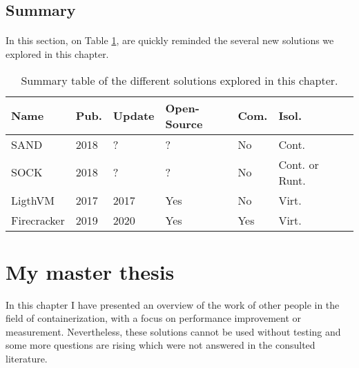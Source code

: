 \subsection{Summary}
\paragraph{}In this section, on Table \ref{tab:summary}, are quickly reminded the several new solutions we explored in this chapter.
\begin{table}[!h]

  \begin{center}
    \begin{tabular}{|p{}|p{}|p{}|p{}|p{}|p{}|p{}|}
       \hline
       \textbf{Name} & \textbf{Pub.}\footnotemark & \textbf{Update}\footnotemark & \textbf{Open-Source} & \textbf{Com.}\footnotemark & \textbf{Isol.}\footnotemark \\
       \hline
       SAND\cite{akkus2018sand} & 2018 & ? & ? & No & Cont. \\
       \hline
       SOCK\cite{oakes2018sock} & 2018 & ? & ? & No & Cont. or Runt. \\
       \hline
       LigthVM\cite{manco2017my} & 2017 & 2017 & Yes & No & Virt. \\
       \hline
       Firecracker\cite{agachefirecracker} & 2019 & 2020 & Yes & Yes & Virt.\\
       \hline
    \end{tabular}
  \end{center}
  \caption{Summary table of the different solutions explored in this chapter.}
  \label{tab:summary}
\end{table}

\section{My master thesis}
In this chapter I have presented an overview of the work of other people in the field of containerization, with a focus on performance improvement or measurement.  Nevertheless, these solutions cannot be used without testing and some more questions are rising which were not answered in the consulted literature.


